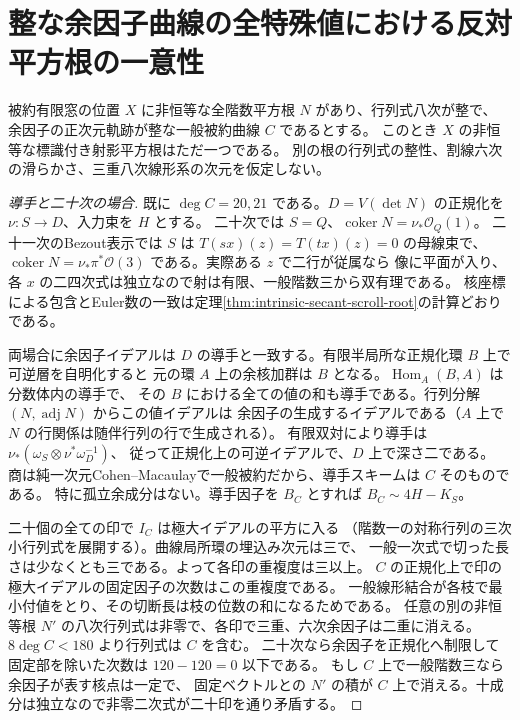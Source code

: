 \section{整な余因子曲線の全特殊値における反対平方根の一意性}
\label{sec:integral-conductor-identifiability}
\begin{theorem}\label{thm:integral-conductor-identifiability}
被約有限窓の位置 $X$ に非恒等な全階数平方根 $N$ があり、行列式八次が整で、
余因子の正次元軌跡が整な一般被約曲線 $C$ であるとする。
このとき $X$ の非恒等な標識付き射影平方根はただ一つである。
別の根の行列式の整性、割線六次の滑らかさ、三重八次線形系の次元を仮定しない。
\end{theorem}
\begin{proof}[導手と二十次の場合]
既に $\deg C=20,21$ である。$D=V(\det N)$ の正規化を $\nu:S\to D$、入力束を $H$ とする。
二十次では $S=Q$、$\operatorname{coker}N=\nu_*\mathcal O_Q(1)$。
二十一次のBezout表示では $S$ は $T(sx)(z)=T(tx)(z)=0$ の母線束で、
$\operatorname{coker}N=\nu_*\pi^*\mathcal O(3)$ である。実際ある $z$ で二行が従属なら
像に平面が入り、各 $x$ の二四次式は独立なので射は有限、一般階数三から双有理である。
核座標による包含とEuler数の一致は定理\ref{thm:intrinsic-secant-scroll-root}の計算どおりである。

両場合に余因子イデアルは $D$ の導手と一致する。有限半局所な正規化環 $B$ 上で可逆層を自明化すると
元の環 $A$ 上の余核加群は $B$ となる。$\operatorname{Hom}_A(B,A)$ は分数体内の導手で、
その $B$ における全ての値の和も導手である。行列分解 $(N,\operatorname{adj}N)$ からこの値イデアルは
余因子の生成するイデアルである（$A$ 上で $N$ の行関係は随伴行列の行で生成される）。
有限双対により導手は $\nu_*(\omega_S\otimes\nu^*\omega_D^{-1})$、
従って正規化上の可逆イデアルで、$D$ 上で深さ二である。
商は純一次元Cohen--Macaulayで一般被約だから、導手スキームは $C$ そのものである。
特に孤立余成分はない。導手因子を $B_C$ とすれば $B_C\sim4H-K_S$。

二十個の全ての印で $I_C$ は極大イデアルの平方に入る
（階数一の対称行列の三次小行列式を展開する）。曲線局所環の埋込み次元は三で、
一般一次式で切った長さは少なくとも三である。よって各印の重複度は三以上。
$C$ の正規化上で印の極大イデアルの固定因子の次数はこの重複度である。
一般線形結合が各枝で最小付値をとり、その切断長は枝の位数の和になるためである。
任意の別の非恒等根 $N'$ の八次行列式は非零で、各印で三重、六次余因子は二重に消える。
$8\deg C<180$ より行列式は $C$ を含む。
二十次なら余因子を正規化へ制限して固定部を除いた次数は $120-120=0$ 以下である。
もし $C$ 上で一般階数三なら余因子が表す核点は一定で、
固定ベクトルとの $N'$ の積が $C$ 上で消える。十成分は独立なので非零二次式が二十印を通り矛盾する。
\end{proof}

